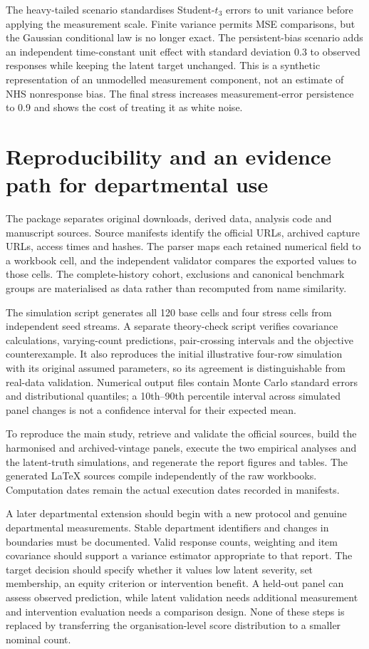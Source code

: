 \documentclass[11pt,letterpaper]{article}
\begin{document}
The heavy-tailed scenario standardises Student-$t_3$ errors to unit variance before applying the measurement scale. Finite variance permits MSE comparisons, but the Gaussian conditional law is no longer exact. The persistent-bias scenario adds an independent time-constant unit effect with standard deviation 0.3 to observed responses while keeping the latent target unchanged. This is a synthetic representation of an unmodelled measurement component, not an estimate of NHS nonresponse bias. The final stress increases measurement-error persistence to 0.9 and shows the cost of treating it as white noise.

\section{Reproducibility and an evidence path for departmental use}\label{app:repro}
The package separates original downloads, derived data, analysis code and manuscript sources. Source manifests identify the official URLs, archived capture URLs, access times and hashes. The parser maps each retained numerical field to a workbook cell, and the independent validator compares the exported values to those cells. The complete-history cohort, exclusions and canonical benchmark groups are materialised as data rather than recomputed from name similarity.

The simulation script generates all 120 base cells and four stress cells from independent seed streams. A separate theory-check script verifies covariance calculations, varying-count predictions, pair-crossing intervals and the objective counterexample. It also reproduces the initial illustrative four-row simulation with its original assumed parameters, so its agreement is distinguishable from real-data validation. Numerical output files contain Monte Carlo standard errors and distributional quantiles; a 10th--90th percentile interval across simulated panel changes is not a confidence interval for their expected mean.

To reproduce the main study, retrieve and validate the official sources, build the harmonised and archived-vintage panels, execute the two empirical analyses and the latent-truth simulations, and regenerate the report figures and tables. The generated LaTeX sources compile independently of the raw workbooks. Computation dates remain the actual execution dates recorded in manifests.

A later departmental extension should begin with a new protocol and genuine departmental measurements. Stable department identifiers and changes in boundaries must be documented. Valid response counts, weighting and item covariance should support a variance estimator appropriate to that report. The target decision should specify whether it values low latent severity, set membership, an equity criterion or intervention benefit. A held-out panel can assess observed prediction, while latent validation needs additional measurement and intervention evaluation needs a comparison design. None of these steps is replaced by transferring the organisation-level score distribution to a smaller nominal count.
\end{document}
